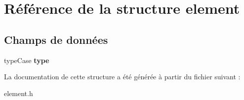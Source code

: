 \hypertarget{structelement}{\section{Référence de la structure element}
\label{structelement}
}
\subsection*{Champs de données}
\begin{DoxyCompactItemize}
\item 
\hypertarget{structelement_ae8958a294110f48590d1db3b2cbe9783}{type\-Case {\bfseries type}}\label{structelement_ae8958a294110f48590d1db3b2cbe9783}

\end{DoxyCompactItemize}


La documentation de cette structure a été générée à partir du fichier suivant \-:\begin{DoxyCompactItemize}
\item 
element.\-h\end{DoxyCompactItemize}
